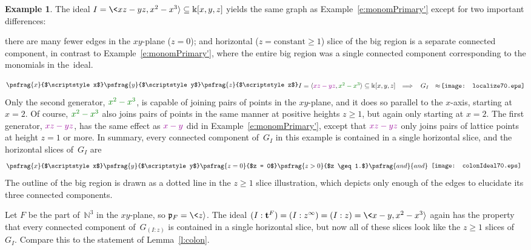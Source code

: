 \documentclass[12pt]{amsart}
\numberwithin{equation}{section}
\theoremstyle{definition}
\newtheorem{example}[thm]{Example}
\begin{document}
\begin{example}\label{e:localize}
The ideal $I = \<xz-yz,x^2-x^3{\rangle} \subseteq {\Bbbk}[x,y,z]$ yields the same
graph as Example~\ref{e:monomPrimary'} except for two important
differences:
\begin{itemize}
\itemhere there are many fewer edges in the $xy$-plane ($z = 0$); and
\itemevery horizontal ($z = \text{constant} \geq 1$) slice of the big
region is a separate connected component, in contrast to
Example~\ref{e:monomPrimary'}, where the entire big region
was a single connected component corresponding to the monomials in
the~ideal.
\end{itemize}
$$\psfrag{x}{$\scriptstyle x$}
\psfrag{y}{$\scriptstyle y$}
\psfrag{z}{$\scriptstyle z$}
\begin{array}{@{}c@{\ }c@{}}
\\[-3ex]
  \begin{array}{@{}c}
  I = {\langle}{\color{darkpurple}xz-yz},{\color{darkgreen}x^2-x^3}{\rangle}
  \subseteq {\Bbbk}[x,y,z]
  \quad{\Longrightarrow}\ 
  \end{array}
&
  G_I\ \ \approx \begin{array}{@{\!}c@{}}\texttt{[image: localize70.eps]}\end{array}
\\[-1ex]
\end{array}
$$Only the second generator, ${\color{darkgreen}x^2-x^3}$, is capable of
joining pairs of points in the $xy$-plane, and it does so parallel to
the $x$-axis, starting at $x = 2$.  Of course,
${\color{darkgreen}x^2-x^3}$ also joins pairs of points in the same
manner at positive heights $z \geq 1$, but again only starting at $x =
2$.  The first generator, ${\color{darkpurple}xz-yz}$, has the same
effect as ${\color{darkpurple}x-y}$ did in
Example~\ref{e:monomPrimary'}, except that ${\color{darkpurple}xz-yz}$
only joins pairs of lattice points at height $z = 1$ or more.  In
summary, every connected component of~$G_I$ in this example is
contained in a single horizontal slice, and the horizontal slices
of~$G_I$ are
$$\psfrag{x}{$\scriptstyle x$}
\psfrag{y}{$\scriptstyle y$}
\psfrag{z=0}{$z = 0$}
\psfrag{z>0}{$z \geq 1.$}
\psfrag{and}{and}
\begin{array}{c}\\[-3.5ex]\texttt{[image: colonIdeal70.eps]}\\[-.5ex]\end{array}
$$
The outline of the big region
is drawn as a dotted line in the $z \geq 1$ slice illustration, which
depicts only enough of the edges to elucidate its three connected
components.

Let $F$ be the part of~${\mathbb{N}}^3$ in the $xy$-plane, so ${\mathfrak{p}}_F = \<z{\rangle}$.
The ideal $(I:{\mathbf{t}}^F) = (I:z^\infty) = (I:z) = \<x-y,x^2-x^3{\rangle}$ again
has the property that every connected component of~$G_{(I:z)}$ is
contained in a single horizontal slice, but now all of these slices
look like the $z \geq 1$ slices of~$G_I$.  Compare this to the
statement of Lemma~\ref{l:colon}.
\end{example}
\end{document}
